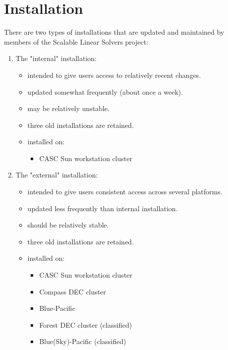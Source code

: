 \chapter{Installation}
\label{Installation}

There are two types of \hypre{} installations that are updated and
maintained by members of the Scalable Linear Solvers project:
\begin{enumerate}

\item The "internal" installation:
   \begin{itemize}
   \item intended to give users access to relatively recent changes.
   \item updated somewhat frequently (about once a week).
   \item may be relatively unstable.
   \item three old installations are retained.
   \item installed on:
      \begin{itemize}
      \item CASC Sun workstation cluster
      \end{itemize}
   \end{itemize}

\item The "external" installation:
   \begin{itemize}
   \item intended to give users consistent access across several platforms.
   \item updated less frequently than internal installation.
   \item should be relatively stable.
   \item three old installations are retained.
   \item installed on:
      \begin{itemize}
       \item CASC Sun workstation cluster
       \item Compass DEC cluster
       \item Blue-Pacific
       \item Forest DEC cluster  (classified)
       \item Blue(Sky)-Pacific   (classified)
      \end{itemize}
   \end{itemize}

\end{enumerate}

